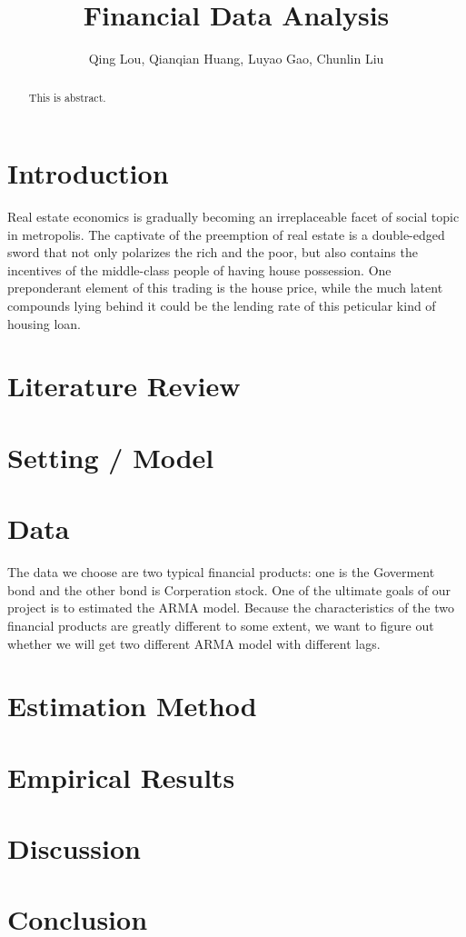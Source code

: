 \documentclass[12pt,letterpaper]{article}
\begin{document}
\title{\textbf{\Large Financial Data Analysis}}
\author{Qing Lou, Qianqian Huang, Luyao Gao, Chunlin Liu}
\date{}
\maketiitle 


\begin{abstract}
This is abstract.
\end{abstract}


\section{Introduction}

\noindent 
Real estate economics is gradually becoming an irreplaceable facet of social topic in metropolis. 
The captivate of the preemption of real estate is a double-edged sword that not only polarizes the rich and the poor, but also contains the incentives of the middle-class people of having house possession.
One preponderant element of this trading is the house price, while the much latent compounds lying behind it could be the lending rate of this peticular kind of housing loan.

\section{Literature Review}

\section{Setting / Model}

\section{Data}
         The data we choose are two typical financial products: one is the Goverment bond and 
         the other bond is Corperation stock. One of the ultimate goals of our project is to 
         estimated the ARMA model. Because the characteristics of the two financial products 
         are greatly different to some extent, we want to figure out whether we will get two 
         different ARMA model with different lags.

\section{Estimation Method}

\section{Empirical Results}

\section{Discussion}

\section{Conclusion}
\end{document}
